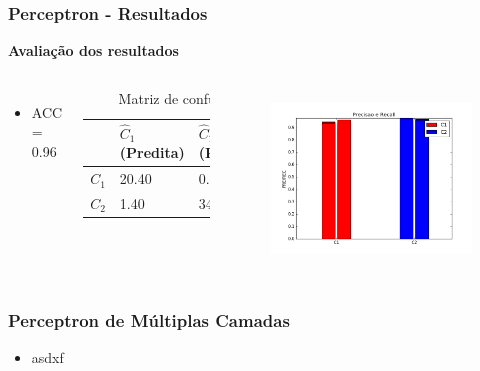 \documentclass{beamer}
\begin{document}
\begin{frame}
\frametitle{Perceptron - Resultados}
\textbf{Avaliação dos resultados}
\begin{columns}[c] 
\begin{itemize}
\item ACC = 0.96
\end{itemize}

\begin{table}
\begin{tabular}{l l l}
\toprule
 & \textbf{$\hat{C}_1$ (Predita)} & \textbf{$\hat{C}_2$(Predita)}\\
\midrule
$C_1$ & 20.40&0.80\\ 
$C_2$ & 1.40&34.30\\ 
\bottomrule
\end{tabular}
\caption{Matriz de confusão}
\end{table}


\begin{figure}[H]
\centering
  \includegraphics[width=\linewidth]{../img/perc_rec.png}
  \label{fig:percep}
\end{figure}%

\end{columns}
\end{frame}


\begin{frame}
\frametitle{Perceptron de Múltiplas Camadas}
\begin{itemize}
  \item asdxf
\end{itemize}
\end{frame}
\end{document}
